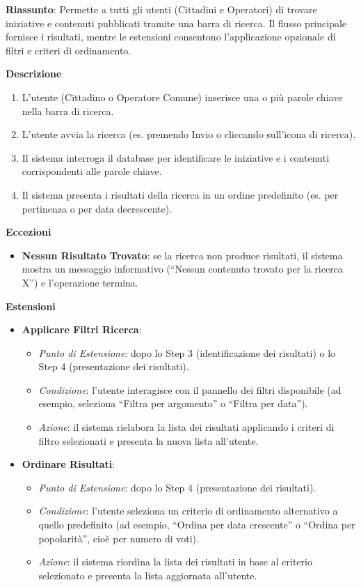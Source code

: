 \documentclass{article}
\begin{document}
\textbf{Riassunto}: Permette a tutti gli utenti (Cittadini e Operatori) di trovare iniziative e contenuti pubblicati tramite una barra di ricerca. Il flusso principale fornisce i risultati, mentre le estensioni consentono l'applicazione opzionale di filtri e criteri di ordinamento.

\textbf{Descrizione}
\begin{enumerate}
    \item L'utente (Cittadino o Operatore Comune) inserisce una o più parole chiave nella barra di ricerca.
    \item L'utente avvia la ricerca (es. premendo Invio o cliccando sull'icona di ricerca).
    \item Il sistema interroga il database per identificare le iniziative e i contenuti corrispondenti alle parole chiave.
    \item Il sistema presenta i risultati della ricerca in un ordine predefinito (es. per pertinenza o per data decrescente).
\end{enumerate}

\textbf{Eccezioni}
\begin{itemize}
    \item \textbf{Nessun Risultato Trovato}: se la ricerca non produce risultati, il sistema mostra un messaggio informativo (``Nessun contenuto trovato per la ricerca X'') e l'operazione termina.
\end{itemize}

\textbf{Estensioni}
\begin{itemize}
    \item \textbf{Applicare Filtri Ricerca}:
    \begin{itemize}
        \item \textit{Punto di Estensione}: dopo lo Step 3 (identificazione dei risultati) o lo Step 4 (presentazione dei risultati).
        \item \textit{Condizione}: l'utente interagisce con il pannello dei filtri disponibile (ad esempio, seleziona ``Filtra per argomento'' o ``Filtra per data'').
        \item \textit{Azione}: il sistema rielabora la lista dei risultati applicando i criteri di filtro selezionati e presenta la nuova lista all'utente.
    \end{itemize}
    \item \textbf{Ordinare Risultati}:
    \begin{itemize}
        \item \textit{Punto di Estensione}: dopo lo Step 4 (presentazione dei risultati).
        \item \textit{Condizione}: l'utente seleziona un criterio di ordinamento alternativo a quello predefinito (ad esempio, ``Ordina per data crescente'' o ``Ordina per popolarità'', cioè per numero di voti).
        \item \textit{Azione}: il sistema riordina la lista dei risultati in base al criterio selezionato e presenta la lista aggiornata all'utente.
    \end{itemize}
\end{itemize}
\end{document}
